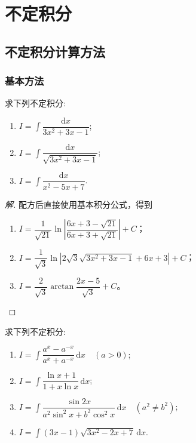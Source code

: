 \documentclass[../../数学分析培优讲义(答案版).tex]{subfiles}
\begin{document}
\setcounter{chapter}{4}
\pagestyle{fancy}

\chapter{不定积分}

\section{不定积分计算方法}

\subsection{基本方法}

\begin{example}
求下列不定积分:
\begin{enumerate}[label=(\arabic*)]
    \item $\displaystyle I=\int\dfrac{\mathrm{d}x}{3x^2+3x-1}$;
    \item $\displaystyle I=\int\dfrac{\mathrm{d}x}{\sqrt{3x^2+3x-1}}$;
    \item $\displaystyle I=\int\dfrac{\mathrm{d}x}{x^2-5x+7}$.
\end{enumerate}
\end{example}

\begin{proof}[解]
配方后直接使用基本积分公式，得到
\begin{enumerate}[label=(\arabic*)]
    \item $\displaystyle I=\dfrac{1}{\sqrt{21}}\ln\left|\dfrac{6x+3-\sqrt{21}}{6x+3+\sqrt{21}}\right|+C$；
    \item $\displaystyle I=\dfrac{1}{\sqrt3}\ln\left|2\sqrt3\sqrt{3x^2+3x-1}+6x+3\right|+C$；
    \item $\displaystyle I=\dfrac{2}{\sqrt3}\arctan\dfrac{2x-5}{\sqrt3}+C$。
\end{enumerate}
\end{proof}

\begin{example}
求下列不定积分:
\begin{enumerate}[label=(\arabic*)]
    \item $\displaystyle I=\int\dfrac{a^x-a^{-x}}{a^x+a^{-x}}\,\mathrm{d}x\quad(a>0)$;
    \item $\displaystyle I=\int\dfrac{\ln x+1}{1+x\ln x}\,\mathrm{d}x$;
    \item $\displaystyle I=\int\dfrac{\sin2x}{a^2\sin^2x+b^2\cos^2x}\,\mathrm{d}x\quad(a^2\neq b^2)$;
    \item $\displaystyle I=\int(3x-1)\sqrt{3x^2-2x+7}\,\mathrm{d}x$.
\end{enumerate}
\end{example}
\end{document}
